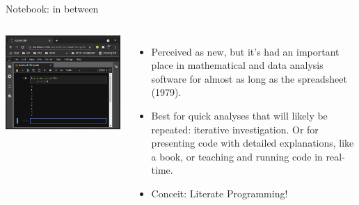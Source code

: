 \documentclass[aspectratio=169]{beamer}
\begin{document}
\begin{frame}{Notebook: in between}
\vspace{0.2 cm}
\begin{columns}
\includegraphics[width=\linewidth]{../img/fundamental-3-modes-notebook.png}

\large
\begin{itemize}\setlength{\itemsep}{0.25 cm}
\item<1-> Perceived as new, but it's had an important place in mathematical and data analysis software for almost as long as the spreadsheet (1979).
\item<2-> Best for quick analyses that will likely be repeated: iterative investigation. Or for presenting code with detailed explanations, like a book, or teaching and running code in real-time.
\item<3-> Conceit: Literate Programming!
\end{itemize}
\end{columns}
\end{frame}
\end{document}
